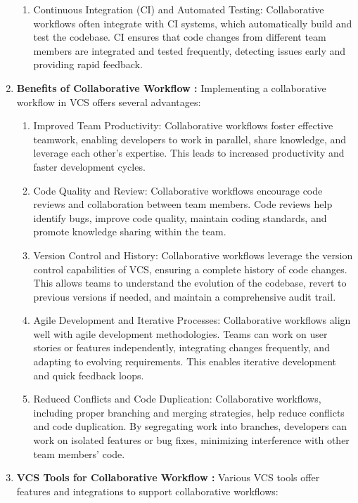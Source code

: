 \begin{enumerate}
\begin{enumerate}
        \item Continuous Integration (CI) and Automated Testing: Collaborative workflows often integrate with CI systems, which automatically build and test the codebase. CI ensures that code changes from different team members are integrated and tested frequently, detecting issues early and providing rapid feedback.
    \end{enumerate}
    \item \textbf{Benefits of Collaborative Workflow : }Implementing a collaborative workflow in VCS offers several advantages:
    \begin{enumerate}
        \item Improved Team Productivity: Collaborative workflows foster effective teamwork, enabling developers to work in parallel, share knowledge, and leverage each other's expertise. This leads to increased productivity and faster development cycles.
        \item Code Quality and Review: Collaborative workflows encourage code reviews and collaboration between team members. Code reviews help identify bugs, improve code quality, maintain coding standards, and promote knowledge sharing within the team.
        \item Version Control and History: Collaborative workflows leverage the version control capabilities of VCS, ensuring a complete history of code changes. This allows teams to understand the evolution of the codebase, revert to previous versions if needed, and maintain a comprehensive audit trail.
        \item Agile Development and Iterative Processes: Collaborative workflows align well with agile development methodologies. Teams can work on user stories or features independently, integrating changes frequently, and adapting to evolving requirements. This enables iterative development and quick feedback loops.
        \item Reduced Conflicts and Code Duplication: Collaborative workflows, including proper branching and merging strategies, help reduce conflicts and code duplication. By segregating work into branches, developers can work on isolated features or bug fixes, minimizing interference with other team members' code.
    \end{enumerate}
    \item \textbf{VCS Tools for Collaborative Workflow : }Various VCS tools offer features and integrations to support collaborative workflows:
    \begin{enumerate}

\end{enumerate}
\end{enumerate}
